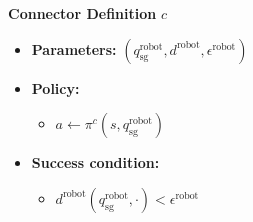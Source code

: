 \noindent\hrulefill

\noindent \textbf{Connector Definition} $c$

\begin{itemize}\label{Def:Connector}
    \item \textbf{Parameters:} $(q^{\text{robot}}_\text{sg}, d^\text{robot}, \epsilon^\text{robot} )$
    \item \textbf{Policy:}
        \begin{itemize}
            \item $a \gets \pi^c(s, q^{\text{robot}}_\text{sg})$
        \end{itemize}

    \item \textbf{Success condition:}
    \begin{itemize}
        \item $d^\text{robot}(q^\text{robot}_\text{sg}, \cdot) < \epsilon^\text{robot}$
    \end{itemize}
\end{itemize}
\noindent\hrulefill

